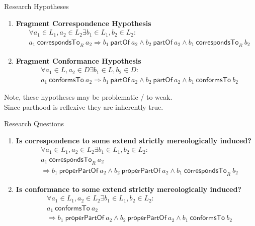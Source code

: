 \documentclass{beamer}
\newcommand{\partOf}{~\textsf{partOf}~}
\newcommand{\properPartOf}{~\textsf{properPartOf}~}
\newcommand{\correspondsToR}[1]{~\textsf{correspondsTo}_{#1}~}
\newcommand{\conformsTo}{~\textsf{conformsTo}~}
\begin{document}
\begin{frame}{Research Hypotheses}
\begin{enumerate}[RH1]
\item
\textbf{Fragment Correspondence Hypothesis}
{\scriptsize
\begin{align*}
&\forall a_1 \in L_1, a_2 \in L_2 \exists b_1 \in L_1, b_2 \in L_2 :  
\\&a_1 \correspondsToR{R} a_2
\Rightarrow 
b_1 \partOf a_2 
\wedge b_2 \partOf a_2
\wedge b_1 \correspondsToR{R} b_2
\end{align*}
}
\item
\textbf{Fragment Conformance Hypothesis}
{\scriptsize
\begin{align*}
&\forall a_1 \in L, a_2 \in D \exists b_1 \in L, b_2 \in D : 
\\&a_1 \conformsTo a_2
\Rightarrow 
b_1 \partOf a_2
\wedge b_2 \partOf a_2
\wedge b_1 \conformsTo b_2
\end{align*}
}
\end{enumerate}
\begin{center}
\tiny
Note, these hypotheses may be problematic / to weak.
\\Since parthood is reflexive they are inherently true.
\end{center}
\end{frame}

\begin{frame}{Research Questions}
\begin{enumerate}[RQ1]

\item
\textbf{Is correspondence to some extend strictly mereologically induced?}
{\scriptsize
\begin{align*}
&\forall a_1 \in L_1, a_2 \in L_2 \exists b_1 \in L_1, b_2 \in L_2 :
\\&a_1 \correspondsToR{R} a_2
\\&\Rightarrow 
b_1 \properPartOf a_2 
\wedge b_2 \properPartOf a_2 
\wedge b_1 \correspondsToR{R} b_2
\end{align*}
}

\item
\textbf{Is conformance to some extend strictly mereologically induced?}
{\scriptsize
\begin{align*}
&\forall a_1 \in L_1, a_2 \in L_2 \exists b_1 \in L_1, b_2 \in L_2 :
\\&a_1 \conformsTo a_2
\\&\Rightarrow 
b_1 \properPartOf a_2 
\wedge b_2 \properPartOf a_2 
\wedge b_1 \conformsTo b_2
\end{align*}
}

\end{enumerate}
\end{frame}
\end{document}
